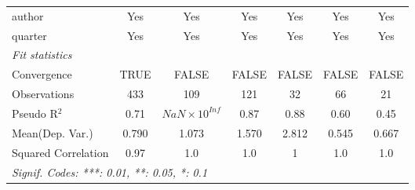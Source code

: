 \begin{tabular}{lcccccc}
   author                                                     & Yes         & Yes                   & Yes           & Yes         & Yes           & Yes\\  
   quarter                                                    & Yes         & Yes                   & Yes           & Yes         & Yes           & Yes\\  
   \midrule
   \emph{Fit statistics}\\
   Convergence                                                &TRUE         & FALSE                 & FALSE         & FALSE       & FALSE         & FALSE\\  
   Observations                                               & 433         & 109                   & 121           & 32          & 66            & 21\\  
   Pseudo R$^2$                                               & 0.71        & $NaN\times 10^{Inf}$  & 0.87          & 0.88        & 0.60          & 0.45\\  
Mean(Dep. Var.) & 0.790 & 1.073 & 1.570 & 2.812 & 0.545 & 0.667 \\
   Squared Correlation                                        & 0.97        & 1.0                   & 1.0           & 1           & 1.0           & 1.0\\  
   \midrule \midrule
   \multicolumn{7}{l}{\emph{Signif. Codes: ***: 0.01, **: 0.05, *: 0.1}}\\
\end{tabular}
\par\endgroup
